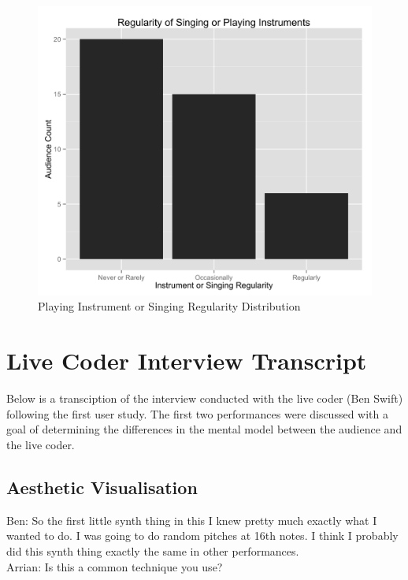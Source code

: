 \begin{figure}
    \centering
    \includegraphics[width=1.0\linewidth]{../study-2/results/graphs/instrument-regularity.png}
    \caption{Playing Instrument or Singing Regularity Distribution}
    \label{instrumentdistribution}
\end{figure}


\chapter{Live Coder Interview Transcript}

Below is a transciption of the interview conducted with the live coder (Ben Swift) following the first user study. The first two performances were discussed with a goal of determining the differences in the mental model between the audience and the live coder.

\section*{Aesthetic Visualisation}

Ben: So the first little synth thing in this I knew pretty much exactly what I wanted to do. I was going to do random pitches at 16th notes. I think I probably did this synth thing exactly the same in other performances.\\

Arrian: Is this a common technique you use?\\

